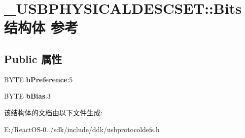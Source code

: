 \hypertarget{struct___u_s_b_p_h_y_s_i_c_a_l_d_e_s_c_s_e_t_1_1_bits}{}\section{\+\_\+\+U\+S\+B\+P\+H\+Y\+S\+I\+C\+A\+L\+D\+E\+S\+C\+S\+ET\+:\+:Bits结构体 参考}
\label{struct___u_s_b_p_h_y_s_i_c_a_l_d_e_s_c_s_e_t_1_1_bits}
\subsection*{Public 属性}
\begin{DoxyCompactItemize}
\item 
\mbox{\label{struct___u_s_b_p_h_y_s_i_c_a_l_d_e_s_c_s_e_t_1_1_bits_a2064909fcfe301fff8ef0848668ca9a5}} 
B\+Y\+TE {\bfseries b\+Preference}\+:5
\item 
\mbox{\label{struct___u_s_b_p_h_y_s_i_c_a_l_d_e_s_c_s_e_t_1_1_bits_a1d6f58b5e713c0820062bdcaf3a9594e}} 
B\+Y\+TE {\bfseries b\+Bias}\+:3
\end{DoxyCompactItemize}


该结构体的文档由以下文件生成\+:\begin{DoxyCompactItemize}
\item 
E\+:/\+React\+O\+S-\/0../sdk/include/ddk/usbprotocoldefs.\+h\end{DoxyCompactItemize}
